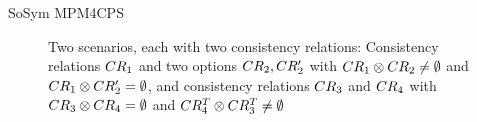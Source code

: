 \begin{copiedFrom}{SoSym MPM4CPS}
\begin{figure}
    \centering
    \begin{subfigure}{\textwidth}
        \centering
        
    \end{subfigure}

    \vspace{1em}
    \begin{subfigure}{\textwidth}
        \centering
        
    \end{subfigure}
    \caption[Examples for consistency relation concatenation]{Two scenarios, each with two consistency relations: 
    Consistency relations $CR_{1}$ and two options $CR_{2}, CR'_{2}$ with $CR_{1} \otimes CR_{2} \neq \emptyset$ and $CR_{1} \otimes CR'_{2} = \emptyset$, and consistency relations $CR_{3}$ and $CR_{4}$ with $CR_{3} \otimes CR_{4} = \emptyset$ and $CR^T_{4} \otimes CR^T_{3} \neq \emptyset$}
    \label{fig:correctness:formal:concatenation_example}
\end{figure}


\end{copiedFrom}
